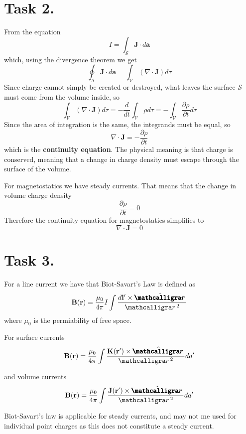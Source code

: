 \documentclass[a4paper,11pt]{article}
\begin{document}
\section*{Task 2.}
\begin{alphalist}
    \item From the equation
        \[
            I = \int_{\mathcal{S}} \mathbf{J} \cdot d\mathbf{a}
        \]
        which, using the divergence theorem we get
        \[
            \oint_{\mathcal{S}} \mathbf{J} \cdot d\mathbf{a} = \int_{\mathcal{V}} (\nabla \cdot \mathbf{J}) d\tau
        \]
        Since charge cannot simply be created or destroyed, what leaves the surface $\mathcal{S}$ must come from the volume inside, so
        \[
            \int_{\mathcal{V}} (\nabla \cdot \mathbf{J}) d\tau = -\frac{d}{dt} \int_{\mathcal{V}} \rho d\tau = -\int_{\mathcal{V}} \frac{\partial \rho}{\partial t} d\tau
        \]
        Since the area of integration is the same, the integrands must be equal, so 
        \[
            \nabla \cdot \mathbf{J} = -\frac{\partial \rho}{\partial t}
        \]
        which is the \textbf{continuity equation}. The physical meaning is that charge is conserved,
        meaning that a change in charge density must escape through the surface of the volume.
    
    \item For magnetostatics we have steady currents. That means that the change in volume charge density
        \[
            \frac{\partial \rho}{\partial t} = 0
        \]
        Therefore the continuity equation for magnetostatics simplifies to
        \[
            \nabla \cdot \mathbf{J} = 0
        \]
\end{alphalist}

\section*{Task 3.}
For a line current we have that Biot-Savart's Law is defined as
\[
    \mathbf{B}(\mathbf{r}) = \frac{\mu_0}{4\pi} I \int \frac{d\mathbf{l'} \times \hat{\boldscriptr}}{\scriptr^2}
\]
where $\mu_0$ is the permiability of free space.

For surface currents
\[
    \mathbf{B}(\mathbf{r}) = \frac{\mu_0}{4\pi} \int \frac{\mathbf{K(r')} \times \hat{\boldscriptr}}{\scriptr^2} da'
\]

and volume currents
\[
    \mathbf{B}(\mathbf{r}) = \frac{\mu_0}{4\pi} \int \frac{\mathbf{J(r')} \times \hat{\boldscriptr}}{\scriptr^2} da'
\]

Biot-Savart's law is applicable for steady currents, and may not me used for individual point charges as this does not constitute 
a steady current.
\end{document}
